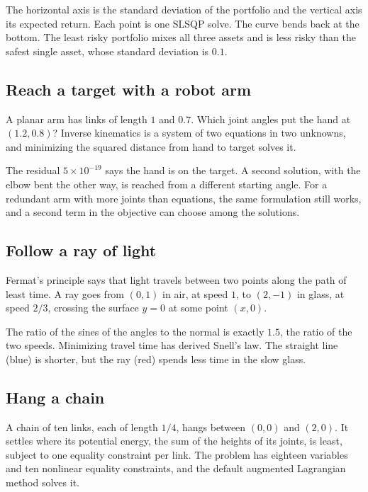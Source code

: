 
The horizontal axis is the standard deviation of the portfolio and the vertical
axis its expected return. Each point is one SLSQP solve. The curve bends back
at the bottom. The least risky portfolio mixes all three assets and is less
risky than the safest single asset, whose standard deviation is \(0.1\).

\subsection*{Reach a target with a robot arm}

A planar arm has links of length \(1\) and \(0.7\). Which joint angles put the
hand at \((1.2, 0.8)\)? Inverse kinematics is a system of two equations in two
unknowns, and minimizing the squared distance from hand to target solves it.


The residual \(5\times10^{-19}\) says the hand is on the target. A second
solution, with the elbow bent the other way, is reached from a different
starting angle. For a redundant arm with more joints than equations, the same
formulation still works, and a second term in the objective can choose among
the solutions.

\subsection*{Follow a ray of light}

Fermat's principle says that light travels between two points along the path
of least time. A ray goes from \((0, 1)\) in air, at speed \(1\), to
\((2, -1)\) in glass, at speed \(2/3\), crossing the surface \(y = 0\) at some
point \((x, 0)\).


The ratio of the sines of the angles to the normal is exactly \(1.5\), the
ratio of the two speeds. Minimizing travel time has derived Snell's law. The
straight line (blue) is shorter, but the ray (red) spends less time in
the slow glass.

\subsection*{Hang a chain}

A chain of ten links, each of length \(1/4\), hangs between \((0, 0)\) and
\((2, 0)\). It settles where its potential energy, the sum of the heights of its
joints, is least, subject to one equality constraint per link. The problem has
eighteen variables and ten nonlinear equality constraints, and the default
augmented Lagrangian method solves it.

